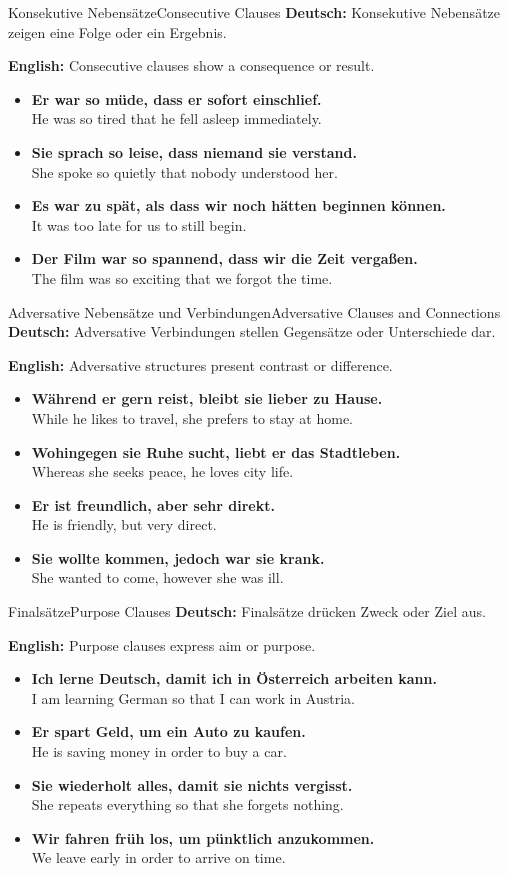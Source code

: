 \documentclass[a4paper,11pt]{article}
\newcommand{\GermanText}[1]{\textbf{Deutsch: }#1\par}
\newcommand{\EnglishText}[1]{{\color{SoftGray}\textbf{English: }#1\par}}
\newcommand{\ExampleItem}[2]{\item \textbf{#1}\\{\color{SoftGray}#2}}
\begin{document}
\begin{grammarentry}{Konsekutive Nebensätze}{Consecutive Clauses}
    \GermanText{Konsekutive Nebensätze zeigen eine Folge oder ein Ergebnis.}
    \EnglishText{Consecutive clauses show a consequence or result.}
    \begin{exbox}
        \begin{itemize}
            \ExampleItem{Er war so müde, dass er sofort einschlief.}{He was so tired that he fell asleep immediately.}
            \ExampleItem{Sie sprach so leise, dass niemand sie verstand.}{She spoke so quietly that nobody understood her.}
            \ExampleItem{Es war zu spät, als dass wir noch hätten beginnen können.}{It was too late for us to still begin.}
            \ExampleItem{Der Film war so spannend, dass wir die Zeit vergaßen.}{The film was so exciting that we forgot the time.}
        \end{itemize}
    \end{exbox}
\end{grammarentry}

\begin{grammarentry}{Adversative Nebensätze und Verbindungen}{Adversative Clauses and Connections}
    \GermanText{Adversative Verbindungen stellen Gegensätze oder Unterschiede dar.}
    \EnglishText{Adversative structures present contrast or difference.}
    \begin{exbox}
        \begin{itemize}
            \ExampleItem{Während er gern reist, bleibt sie lieber zu Hause.}{While he likes to travel, she prefers to stay at home.}
            \ExampleItem{Wohingegen sie Ruhe sucht, liebt er das Stadtleben.}{Whereas she seeks peace, he loves city life.}
            \ExampleItem{Er ist freundlich, aber sehr direkt.}{He is friendly, but very direct.}
            \ExampleItem{Sie wollte kommen, jedoch war sie krank.}{She wanted to come, however she was ill.}
        \end{itemize}
    \end{exbox}
\end{grammarentry}

\begin{grammarentry}{Finalsätze}{Purpose Clauses}
    \GermanText{Finalsätze drücken Zweck oder Ziel aus.}
    \EnglishText{Purpose clauses express aim or purpose.}
    \begin{exbox}
        \begin{itemize}
            \ExampleItem{Ich lerne Deutsch, damit ich in Österreich arbeiten kann.}{I am learning German so that I can work in Austria.}
            \ExampleItem{Er spart Geld, um ein Auto zu kaufen.}{He is saving money in order to buy a car.}
            \ExampleItem{Sie wiederholt alles, damit sie nichts vergisst.}{She repeats everything so that she forgets nothing.}
            \ExampleItem{Wir fahren früh los, um pünktlich anzukommen.}{We leave early in order to arrive on time.}
        \end{itemize}
    \end{exbox}
\end{grammarentry}
\end{document}
